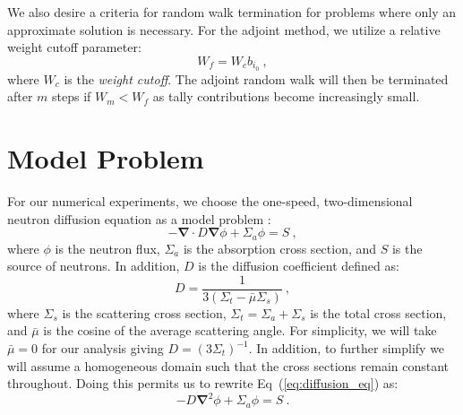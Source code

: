 \documentclass[letterpaper,12pt]{article}
\begin{document}
We also desire a criteria for random walk termination for problems
where only an approximate solution is necessary. For the adjoint
method, we utilize a relative weight cutoff parameter:
\begin{equation}
  W_f = W_c b_{i_0}\:,
  \label{eq:relative_weight_cutoff}
\end{equation}
where $W_c$ is the \textit{weight cutoff}. The adjoint random
walk will then be terminated after $m$ steps if $W_m < W_f$ as tally
contributions become increasingly small.

\section{Model Problem}
For our numerical experiments, we choose the one-speed,
two-dimensional neutron diffusion equation as a model problem
\cite{duderstadt_nuclear_1976}:
\begin{equation}
  -\boldsymbol{\nabla} \cdot D \boldsymbol{\nabla} \phi + \Sigma_a
  \phi = S\:,
  \label{eq:diffusion_eq}
\end{equation}
where $\phi$ is the neutron flux, $\Sigma_a$ is the absorption cross
section, and $S$ is the source of neutrons. In addition, $D$ is the
diffusion coefficient defined as:
\begin{equation}
  D = \frac{1}{3 ( \Sigma_t - \bar{\mu}\Sigma_s )}\:,
  \label{eq:diffusion_coeff}
\end{equation}
where $\Sigma_s$ is the scattering cross section, $\Sigma_t = \Sigma_a
+ \Sigma_s$ is the total cross section, and $\bar{\mu}$ is the cosine
of the average scattering angle. For simplicity, we will take
$\bar{\mu} = 0$ for our analysis giving $D=(3 \Sigma_t)^{-1}$. In
addition, to further simplify we will assume a homogeneous domain such
that the cross sections remain constant throughout. Doing this permits
us to rewrite Eq~(\ref{eq:diffusion_eq}) as:
\begin{equation}
  -D \boldsymbol{\nabla}^2 \phi + \Sigma_a \phi = S\:.
  \label{eq:diffusion_eq_simple}
\end{equation}
\end{document}
